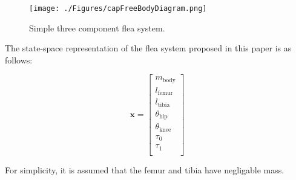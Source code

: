 \begin{figure}[H]
\begin{center}
\texttt{[image: ./Figures/capFreeBodyDiagram.png]}
\caption{Simple three component flea system.}
\label{fig:capFreeBodyDiagram}
\end{center}
\end{figure}
\indent The state-space representation of the flea system proposed in this paper is as follows:

\begin{equation}
    \textbf{x} =
    \begin{bmatrix}
        m_\text{body}\\
        l_\text{femur}\\
        l_\text{tibia}\\
        \theta_\text{hip}\\
        \theta_\text{knee}\\
        \tau_0\\
        \tau_1\\
    \end{bmatrix}
\end{equation}

For simplicity, it is assumed that the femur and tibia have negligable mass.